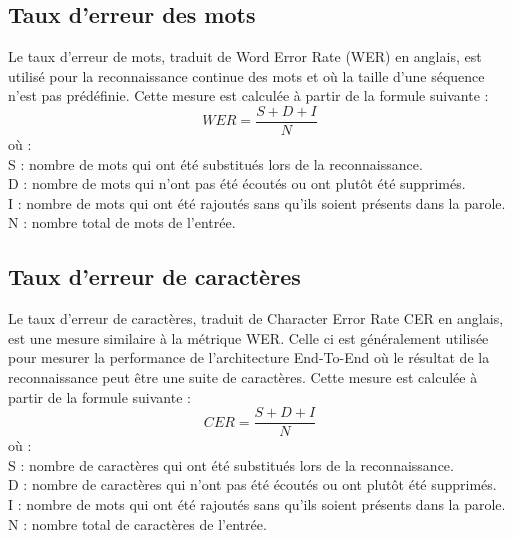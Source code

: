 \subsection{Taux d'erreur des mots}
Le taux d'erreur de mots, traduit de Word Error Rate (WER) en anglais, est utilisé pour la reconnaissance continue des mots et où la taille d'une séquence n'est pas prédéfinie. Cette mesure est calculée à partir de la formule suivante \cite{werformula} : \\
        \begin{equation}
            WER = \frac{S + D + I}{N}
        \end{equation}
        où :\\
        S : nombre de mots qui ont été substitués lors de la reconnaissance.\\
        D : nombre de mots qui n'ont pas été écoutés ou ont plutôt été supprimés.\\
        I : nombre de mots qui ont été rajoutés sans qu'ils soient présents dans la parole.\\
        N : nombre total de mots de l'entrée.
        
\subsection{Taux d'erreur de caractères}
Le taux d'erreur de caractères, traduit de Character Error Rate CER en anglais, est une mesure similaire à la métrique WER. Celle ci est généralement utilisée pour mesurer la performance de l'architecture End-To-End où le résultat de la reconnaissance peut être une suite de caractères. Cette mesure est calculée à partir de la formule suivante : \\
        \begin{equation}
            CER = \frac{S + D + I}{N}
        \end{equation}
        où :\\
        S : nombre de caractères qui ont été substitués lors de la reconnaissance.\\
        D : nombre de caractères qui n'ont pas été écoutés ou ont plutôt été supprimés.\\
        I : nombre de mots qui ont été rajoutés sans qu'ils soient présents dans la parole.\\
        N : nombre total de caractères de l'entrée.

